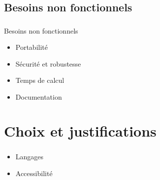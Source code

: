 \documentclass[11pt]{beamer}
\begin{document}
\begin{frame}
	\frametitle{\subsecname}
	\begin{figure}[h]
		\begin{center}
  		\end{center}	
	 \end{figure}
\end{frame}

\subsection{Besoins non fonctionnels}

\begin{frame}
	\frametitle{\subsecname}
	\begin{block}{Besoins non fonctionnels}
		\begin{itemize}
		\item Portabilité
		\item Sécurité et robustesse
		\item Temps de calcul
		\item Documentation
		\end{itemize}
	\end{block}
\end{frame}

\section{Choix et justifications	}	

\begin{frame}
	\frametitle{\secname}
	\begin{block}{}
		\begin{itemize}
		\item Langages
		\item Accessibilité
		\end{itemize}
	\end{block}
\end{frame}
\end{document}
